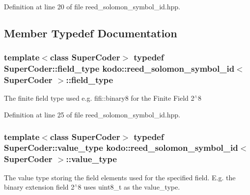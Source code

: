 Definition at line 20 of file reed\-\_\-solomon\-\_\-symbol\-\_\-id.\-hpp.



\subsection{Member Typedef Documentation}
\hypertarget{classkodo_1_1reed__solomon__symbol__id_a4743bd9dd076991ad2bf882b13293d40}{
\subsubsection[{field\-\_\-type}]{\setlength{\rightskip}{0pt plus 5cm}template$<$class Super\-Coder$>$ typedef Super\-Coder\-::field\-\_\-type {\bf kodo\-::reed\-\_\-solomon\-\_\-symbol\-\_\-id}$<$ Super\-Coder $>$\-::{\bf field\-\_\-type}}}\label{classkodo_1_1reed__solomon__symbol__id_a4743bd9dd076991ad2bf882b13293d40}




The finite field type used e.\-g. fifi\-::binary8 for the Finite Field 2$^\wedge$8 

Definition at line 25 of file reed\-\_\-solomon\-\_\-symbol\-\_\-id.\-hpp.

\hypertarget{classkodo_1_1reed__solomon__symbol__id_a86e8c6d7a02eaf6dbd2edde56e4cddad}{
\subsubsection[{value\-\_\-type}]{\setlength{\rightskip}{0pt plus 5cm}template$<$class Super\-Coder$>$ typedef Super\-Coder\-::value\-\_\-type {\bf kodo\-::reed\-\_\-solomon\-\_\-symbol\-\_\-id}$<$ Super\-Coder $>$\-::{\bf value\-\_\-type}}}\label{classkodo_1_1reed__solomon__symbol__id_a86e8c6d7a02eaf6dbd2edde56e4cddad}




The value type storing the field elements used for the specified field. E.\-g. the binary extension field 2$^\wedge$8 uses uint8\-\_\-t as the value\-\_\-type. 

